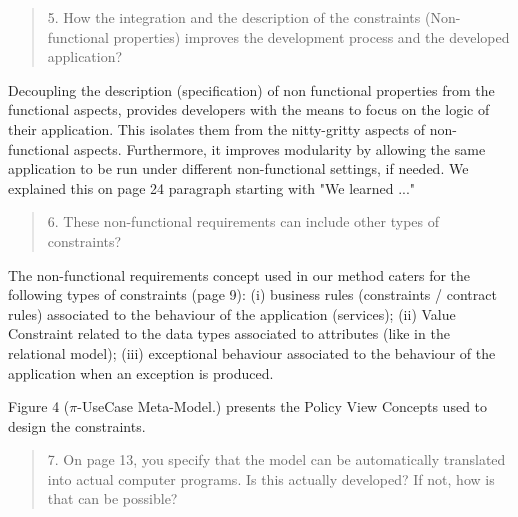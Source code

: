 \documentclass[12pt,a4wide]{article}
\begin{document}
\begin{quotation}\sf\footnotesize

5.    How the integration and the description of the constraints (Non-functional properties) improves the development process and the developed application? 
\end{quotation}

\noindent 
Decoupling the description (specification) of non functional properties from the functional aspects, provides developers with the means to focus on the logic of their application. This isolates them from the nitty-gritty aspects of non-functional aspects. Furthermore, it improves modularity by allowing the same application to be run under different non-functional settings, if needed. We explained this on page 24 paragraph starting with "We learned ..."


\begin{quotation}\sf\footnotesize

6.    These non-functional requirements can include other types of constraints? 
\end{quotation}

\noindent 
The non-functional requirements concept used in our method caters for the following types of constraints (page 9): (i) business rules (constraints / contract rules) associated to the behaviour of the application (services); (ii) Value Constraint related to the data types associated to attributes (like in the relational model); (iii) exceptional behaviour associated to the behaviour of the application when an exception is produced. 


Figure 4 ($\pi$-UseCase Meta-Model.) presents the Policy View Concepts used to design the constraints.

\begin{quotation}\sf\footnotesize

7.    On page 13, you specify that the model can be automatically translated into actual computer programs. Is this actually developed? If not, how is that can be possible? 
\end{quotation}
 
\noindent 
 
\end{document}
